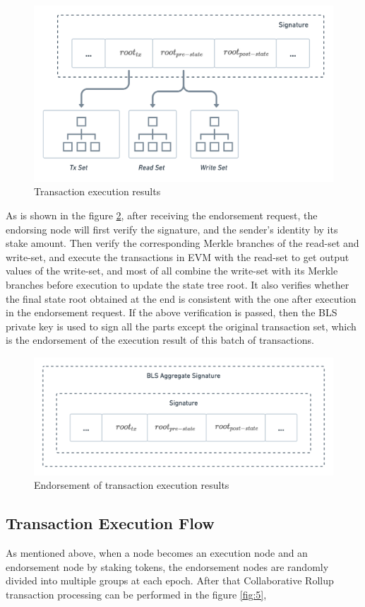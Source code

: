 \documentclass{iacrtrans}
\begin{document}
\begin{figure}[!htbp]
	\centering
	\includegraphics[width=0.8 \textwidth]{images/3.png}
	\caption{Transaction execution results}
	\label{fig:3} 
\end{figure}

As is shown in the figure \ref{fig:4}, after receiving the endorsement request, the endorsing node will first verify the signature, and the sender's identity by its stake amount. Then verify the corresponding Merkle branches of the read-set and write-set, and execute the transactions in EVM with the read-set to get output values of the write-set, and most of all combine the write-set with its Merkle branches before execution to update the state tree root. It also verifies whether the final state root obtained at the end is consistent with the one after execution in the endorsement request. If the above verification is passed, then the BLS private key is used to sign all the parts except the original transaction set, which is the endorsement of the execution result of this batch of transactions. 


\begin{figure}[!htbp]
	\centering
	\includegraphics[width=0.8 \textwidth]{images/4.png}
	\caption{Endorsement of transaction execution results}
	\label{fig:4} 
\end{figure}


\subsection{Transaction Execution Flow}
As mentioned above, when a node becomes an execution node and an endorsement node by staking tokens, the endorsement nodes are randomly divided into multiple groups at each epoch. After that Collaborative Rollup transaction processing can be performed in the figure \ref{fig:5}, 
\end{document}
